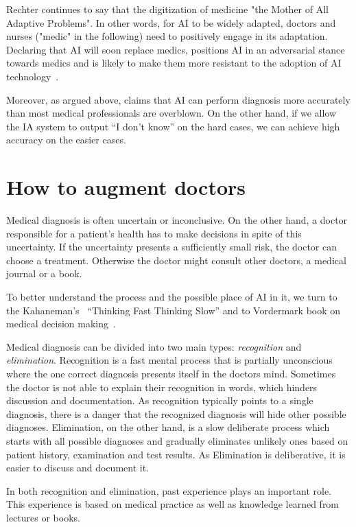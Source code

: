 \documentclass[11pt]{pnas-new}
\begin{document}
Rechter continues to say that the digitization of medicine "the Mother
of All Adaptive Problems". In other words, for AI to be widely
adapted, doctors and nurses ("medic" in the following) need to
positively engage in its adaptation. Declaring that AI will soon
replace medics, positions AI in an adversarial stance towards medics
and is likely to make them more resistant to the adoption of AI
technology~\cite{topol2019deep}.

Moreover, as argued above, claims that AI can perform diagnosis more
accurately than most medical professionals are overblown. On the other
hand, if we allow the IA system to output ``I don't know'' on
the hard cases, we can achieve high accuracy on the easier cases. 

\section{How to augment doctors}
Medical diagnosis is often uncertain or inconclusive. On the other
hand, a doctor responsible for a patient's health has to make
decisions in spite of this uncertainty. If the uncertainty presents a
sufficiently small risk, the doctor can choose a treatment. Otherwise
the doctor might consult other doctors, a medical journal or a book. 

To better understand the process and the possible place of AI in it,
we turn to the Kahaneman's~\cite{kahneman2011thinking} ``Thinking Fast Thinking Slow'' and
to Vordermark book on medical decision
making~\cite{vordermark2019introduction}.

Medical diagnosis can be divided into two main types: {\em
  recognition} and {\em elimination}. Recognition is a fast mental
process that is partially unconscious where the one correct diagnosis presents itself in the doctors mind.  Sometimes the doctor is not able to explain their recognition in words, which hinders discussion and documentation.  As recognition 
typically points to a single diagnosis, there is a danger that the
recognized diagnosis will hide other possible diagnoses.
Elimination, on the other hand, is a slow deliberate process  which starts with all possible diagnoses and gradually eliminates
unlikely ones based on patient history, examination and test
results. As Elimination is deliberative, it is easier to discuss and
document it.

In both recognition and elimination, past experience plays an important role. This experience is based on medical practice as well as knowledge learned from lectures or books. 
\end{document}
